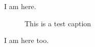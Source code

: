\documentclass{article}
\begin{document}
	I am here.
	\begin{figure}
		\centering
		
		\caption{This is a test caption}
	\end{figure}
	I am here too.
\end{document}
